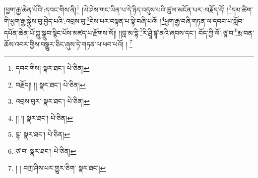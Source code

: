 །ཕྱག་རྒྱ་ཆེན་པོའི་:དབང་གིས་ནི།\footnote{དབང་གིས།  སྣར་ཐང་།  པེ་ཅིན། } །ཡེ་ཤེས་གང་ཡིན་པ་དེ་ཉིད་འདུས་པའི་ཚུལ་མངོན་པར་:བརྗོད་དོ། །\footnote{བརྗོད།། །།  སྣར་ཐང་།  པེ་ཅིན། }དམ་ཚིག་གི་ཕྱག་རྒྱ་སྐྱེས་བུ་བྱེད་པའི་:འབྲས་བུ་\footnote{འབྲས་བུར་  སྣར་ཐང་།  པེ་ཅིན། }ངེས་པར་བསྟན་པ་སྟེ་བཞི་པའོ། །\footnote{།། །།  སྣར་ཐང་།  པེ་ཅིན། }ཕྱག་རྒྱ་བཞི་གཏན་ལ་དབབ་པ་སློབ་དཔོན་ཆེན་པོ་ཀླུ་སྒྲུབ་སྙིང་པོས་མཛད་པ་རྫོགས་སོ།། །།བླ་མ་དྷི་\footnote{དྷ་  སྣར་ཐང་།  པེ་ཅིན། }རི་ཤྲཱི་ཛྙཱ་ནའི་ཞབས་དང་། བོད་ཀྱི་ལོ་:ཙཱ་བ་\footnote{ཙ་བ་  སྣར་ཐང་།  པེ་ཅིན། }རྨ་བན་ཆོས་འབར་གྱིས་བསྒྱུར་ཅིང་ཞུས་ཏེ་གཏན་ལ་ཕབ་པའོ། ། \footnote{། ། བཀྲ་ཤིས་པར་གྱུར་ཅིག་  སྣར་ཐང་། }